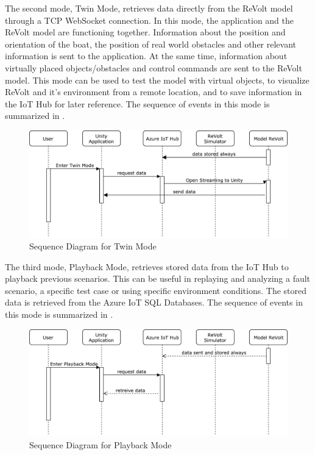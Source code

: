 The second mode, Twin Mode, retrieves data directly from the ReVolt model through a TCP WebSocket connection. In this mode, the application and the ReVolt model are functioning together. Information about the position and orientation of the boat, the position of real world obstacles and other relevant information is sent to the application. At the same time, information about virtually placed objects/obstacles and control commands are sent to the ReVolt model. This mode can be used to test the model with virtual objects, to visualize ReVolt and it's environment from a remote location, and to save information in the IoT Hub for later reference. The sequence of events in this mode is summarized in .
\begin{figure}[H]
\centering
\includegraphics[scale=0.5]{Images/Sequence_Diagram_twin.pdf}
\caption{Sequence Diagram for Twin Mode}
\label{fig:sequenceTwinMode}
\end{figure}


The third mode, Playback Mode, retrieves stored data from the IoT Hub to playback previous scenarios. This can be useful in replaying and analyzing a fault scenario, a specific test case or using specific environment conditions. The stored data is retrieved from the Azure IoT SQL Databases. The sequence of events in this mode is summarized in .

\begin{figure}[H]
\centering
\includegraphics[scale=0.5]{Images/Sequence_Diagram_Playback.pdf}
\caption{Sequence Diagram for Playback Mode}
\label{fig:sequencePlaybackMode}
\end{figure}

